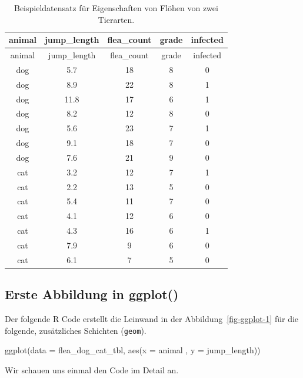 \documentclass[
  letterpaper,
]{scrbook}
\newenvironment{Shaded}{\begin{snugshade}}{\end{snugshade}}
\newcommand{\AttributeTok}[1]{\textcolor[rgb]{0.40,0.45,0.13}{#1}}
\newcommand{\FunctionTok}[1]{\textcolor[rgb]{0.28,0.35,0.67}{#1}}
\newcommand{\NormalTok}[1]{\textcolor[rgb]{0.00,0.23,0.31}{#1}}
\begin{document}
\hypertarget{tbl-cat-dog-ggplot}{}
\begin{longtable}[]{@{}ccccc@{}}
\caption{\label{tbl-cat-dog-ggplot}Beispieldatensatz für Eigenschaften
von Flöhen von zwei Tierarten.}\tabularnewline
\toprule()
animal & jump\_length & flea\_count & grade & infected \\
\midrule()
\endfirsthead
\toprule()
animal & jump\_length & flea\_count & grade & infected \\
\midrule()
\endhead
dog & 5.7 & 18 & 8 & 0 \\
dog & 8.9 & 22 & 8 & 1 \\
dog & 11.8 & 17 & 6 & 1 \\
dog & 8.2 & 12 & 8 & 0 \\
dog & 5.6 & 23 & 7 & 1 \\
dog & 9.1 & 18 & 7 & 0 \\
dog & 7.6 & 21 & 9 & 0 \\
cat & 3.2 & 12 & 7 & 1 \\
cat & 2.2 & 13 & 5 & 0 \\
cat & 5.4 & 11 & 7 & 0 \\
cat & 4.1 & 12 & 6 & 0 \\
cat & 4.3 & 16 & 6 & 1 \\
cat & 7.9 & 9 & 6 & 0 \\
cat & 6.1 & 7 & 5 & 0 \\
\bottomrule()
\end{longtable}

\hypertarget{erste-abbildung-in-ggplot}{%
\subsection{Erste Abbildung in
ggplot()}\label{erste-abbildung-in-ggplot}}

Der folgende R Code erstellt die Leinwand in der
Abbildung~\ref{fig-ggplot-1} für die folgende, zusätzliches Schichten
(\texttt{geom}).

\begin{Shaded}
\begin{Highlighting}[]
\FunctionTok{ggplot}\NormalTok{(}\AttributeTok{data =}\NormalTok{ flea\_dog\_cat\_tbl, }
       \FunctionTok{aes}\NormalTok{(}\AttributeTok{x =}\NormalTok{ animal , }\AttributeTok{y =}\NormalTok{ jump\_length))}
\end{Highlighting}
\end{Shaded}

Wir schauen uns einmal den Code im Detail an.
\end{document}
